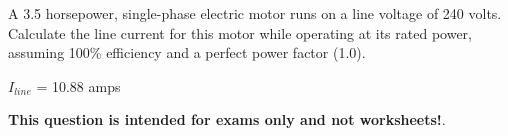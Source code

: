 

A 3.5 horsepower, single-phase electric motor runs on a line voltage of 240 volts.  Calculate the line current for this motor while operating at its rated power, assuming 100\% efficiency and a perfect power factor (1.0).







$I_{line}$ = 10.88 amps







{\bf This question is intended for exams only and not worksheets!}.


